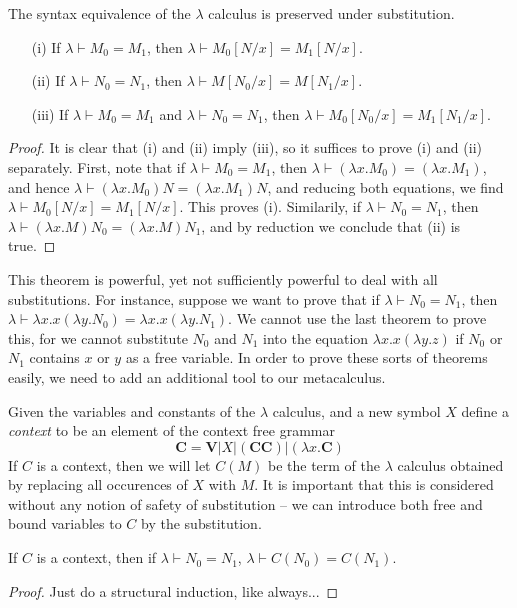 \begin{theorem}
    The syntax equivalence of the $\lambda$ calculus is preserved under substitution.
    \begin{enumerate}
        \item[(i)] If $\lambda \vdash M_0 = M_1$, then $\lambda \vdash M_0[N/x] = M_1[N/x]$.
        \item[(ii)] If $\lambda \vdash N_0 = N_1$, then $\lambda \vdash M[N_0/x] = M[N_1/x]$.
        \item[(iii)] If $\lambda \vdash M_0 = M_1$ and $\lambda \vdash N_0 = N_1$, then $\lambda \vdash M_0[N_0/x] = M_1[N_1/x]$.
    \end{enumerate}
\end{theorem}
\begin{proof}
    It is clear that (i) and (ii) imply (iii), so it suffices to prove (i) and (ii) separately. First, note that if $\lambda \vdash M_0 = M_1$, then $\lambda \vdash (\lambda x.M_0) = (\lambda x.M_1)$, and hence $\lambda \vdash (\lambda x.M_0)N = (\lambda x.M_1)N$, and reducing both equations, we find $\lambda \vdash M_0[N/x] = M_1[N/x]$. This proves (i). Similarily, if $\lambda \vdash N_0 = N_1$, then $\lambda \vdash (\lambda x.M)N_0 = (\lambda x.M)N_1$, and by reduction we conclude that (ii) is true.
\end{proof}

This theorem is powerful, yet not sufficiently powerful to deal with all substitutions. For instance, suppose we want to prove that if $\lambda \vdash N_0 = N_1$, then $\lambda \vdash \lambda x.x(\lambda y.N_0) = \lambda x.x(\lambda y.N_1)$. We cannot use the last theorem to prove this, for we cannot substitute $N_0$ and $N_1$ into the equation $\lambda x.x(\lambda y.z)$ if $N_0$ or $N_1$ contains $x$ or $y$ as a free variable. In order to prove these sorts of theorems easily, we need to add an additional tool to our metacalculus.

Given the variables and constants of the $\lambda$ calculus, and a new symbol $X$ define a \emph{context} to be an element of the context free grammar
%
\[ \mathbf{C} = \mathbf{V} | X | (\mathbf{C} \mathbf{C}) | (\lambda x.\mathbf{C}) \]
%
If $C$ is a context, then we will let $C(M)$ be the term of the $\lambda$ calculus obtained by replacing all occurences of $X$ with $M$. It is important that this is considered without any notion of safety of substitution -- we can introduce both free and bound variables to $C$ by the substitution.

\begin{theorem}
    If $C$ is a context, then if $\lambda \vdash N_0 = N_1$, $\lambda \vdash C(N_0) = C(N_1)$.
\end{theorem}
\begin{proof}
    Just do a structural induction, like always...
\end{proof}

